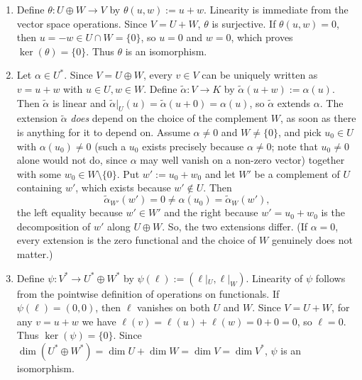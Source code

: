 \begin{exercisesolution}
\label{sol:subspace_complement_dual_decomposition}
\begin{enumerate}[label=\textbf{(\alph*)}]
    \item Define $\theta \colon U \oplus W \to V$ by $\theta(u, w) := u + w$.
    Linearity is immediate from the vector space operations.
    Since $V = U + W$, $\theta$ is surjective.
    If $\theta(u, w) = 0$, then $u = -w \in U \cap W = \{0\}$, so $u = 0$ and $w = 0$, which proves $\ker(\theta) = \{0\}$.
    Thus $\theta$ is an isomorphism.

    \item Let $\alpha \in U^*$. Since $V = U \oplus W$, every $v \in V$ can be uniquely written as $v = u + w$ with $u \in U, w \in W$.
    Define $\tilde{\alpha} \colon V \to K$ by $\tilde{\alpha}(u + w) := \alpha(u)$.
    Then $\tilde{\alpha}$ is linear and $\tilde{\alpha}|_U(u) = \tilde{\alpha}(u + 0) = \alpha(u)$, so $\tilde{\alpha}$ extends $\alpha$.
    The extension $\tilde{\alpha}$ \emph{does} depend on the choice of the complement $W$, as soon as there is anything for it to depend on. Assume $\alpha \ne 0$ and $W \ne \{0\}$, and pick $u_0 \in U$ with $\alpha(u_0) \ne 0$ (such a $u_0$ exists precisely because $\alpha \ne 0$; note that $u_0 \ne 0$ alone would not do, since $\alpha$ may well vanish on a non-zero vector) together with some $w_0 \in W \setminus \{0\}$. Put $w' := u_0 + w_0$ and let $W'$ be a complement of $U$ containing $w'$, which exists because $w' \notin U$. Then
    \[
    \tilde{\alpha}_{W'}(w') = 0 \ne \alpha(u_0) = \tilde{\alpha}_W(w'),
    \]
    the left equality because $w' \in W'$ and the right because $w' = u_0 + w_0$ is the decomposition of $w'$ along $U \oplus W$. So, the two extensions differ. (If $\alpha = 0$, every extension is the zero functional and the choice of $W$ genuinely does not matter.)

    \item Define $\psi \colon V^* \to U^* \oplus W^*$ by $\psi(\ell) := (\ell|_U, \ell|_W)$.
    Linearity of $\psi$ follows from the pointwise definition of operations on functionals.
    If $\psi(\ell) = (0, 0)$, then $\ell$ vanishes on both $U$ and $W$.
    Since $V = U + W$, for any $v = u + w$ we have $\ell(v) = \ell(u) + \ell(w) = 0 + 0 = 0$, so $\ell = 0$.
    Thus $\ker(\psi) = \{0\}$.
    Since $\dim(U^* \oplus W^*) = \dim U + \dim W = \dim V = \dim V^*$, $\psi$ is an isomorphism. \qedhere
\end{enumerate}
\end{exercisesolution}

